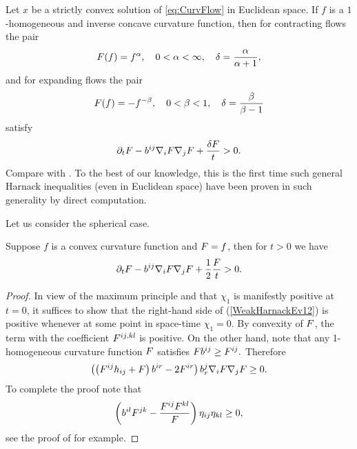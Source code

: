 \documentclass{amsart}
\begin{document}
\begin{remark}\label{HarnackEucCor}
 Let $x$ be a strictly convex solution of \eqref{eq:CurvFlow} in Euclidean space. If $f$ is a $1$-homogeneous and inverse concave curvature function, then for contracting flows the pair
$$F(f)=f^{\alpha},\quad 0<\alpha<\infty, \quad \delta= \frac{\alpha}{\alpha+1},$$
and for expanding flows the pair
$$F(f)=-f^{-\beta}, \quad 0<\beta<1,\quad \delta= \frac{\beta}{\beta-1}$$
satisfy $$\partial_t F-b^{ij}\nabla_iF\nabla_jF+\frac{\delta F}{t}>0.$$
Compare with \cite[Theorem 5.6, Corollary 5.11]{MR1296393}. To the best of our knowledge, this is the first time such general Harnack inequalities (even in Euclidean space) have been proven in such generality by direct computation.
\end{remark}
Let us consider the spherical case.
\begin{theorem}
Suppose $f$ is a  convex curvature function and $F=f$, then for $t>0$ we have
$$\partial_t F-b^{ij}\nabla_iF\nabla_jF+\frac{1}{2}\frac{F}{t}>0.$$
\end{theorem}
\begin{proof}
In view of the maximum principle and that $\chi_1$ is manifestly positive at $t=0$, it suffices to show that the right-hand side of (\ref{WeakHarnackEv12}) is positive whenever at some point in space-time $\chi_1=0$. By convexity of $F$, the term with the coefficient $F^{ij,kl}$ is positive. On the other hand, note that any 1-homogeneous curvature function $F$ satisfies $F b^{ij}\geq F^{ij}.$ Therefore
$$\left(\left(F^{ij}h_{ij}+F\right)b^{ir}-2F^{ir}\right)b^{j}_{r}\nabla_{i}F\nabla_{j}F\ge 0.$$ To complete the proof note that
$$\left(b^{il}F^{jk}-\frac{F^{ij}F^{kl}}{F}\right)\eta_{ij}\eta_{kl}\geq 0,$$
see the proof of \cite[Theorem 2.3]{Andrews:/2007} for example.
\end{proof}
\end{document}
